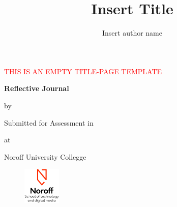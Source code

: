 \begin{titlepage}

  \begin{center}

    \textcolor{red}{\Huge{THIS IS AN EMPTY TITLE-PAGE TEMPLATE}} %


      {\bfseries{\Huge{Reflective Journal}}}


      {\Large{by}}

    \begin{author}
      \author{\Large{Insert author name}}
    \end{author}


    \vspace*{2.5cm}
    Submitted for Assessment in


    \begin{title}
        \title{\bfseries{\huge{Insert Title}}}
    \end{title}

    \vspace*{2.5cm}
    at


    \Large{Noroff University Collegge}

    \vfill


    \begin{figure}[h!]
      \centering
      \includegraphics[height=50pt]{Noroff-Logo.png}
    \end{figure}


  \end{center}
\end{titlepage}
